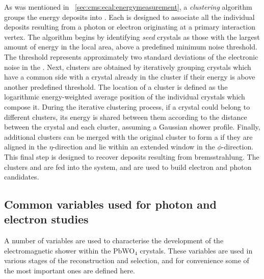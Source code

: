 As was mentioned in \Sec~\ref{sec:cms:ecal:energymeasurement}, a \emph{clustering} algorithm~\cite{CMS-PAS-EGM-13-001,CMS-PAS-EGM-14-001} groups the \ECAL energy deposits into \SC\s. Each \SC is designed to associate all the individual deposits resulting from a photon or electron originating at a primary interaction vertex.
The algorithm begins by identifying \emph{seed} crystals as those with the largest amount of energy in the local area, above a predefined minimum noise threshold. The threshold %
represents approximately two standard deviations of the electronic noise in the \ECAL. Next, clusters are obtained by iteratively grouping crystals which have a common side with a crystal already in the cluster if their energy is above another predefined threshold. The location of a cluster is defined as the logarithmic energy-weighted average position of the individual crystals which compose it. During the iterative clustering process, if a crystal could belong to different clusters, its energy is shared between them according to the distance between the crystal and each cluster, assuming a Gaussian shower profile. Finally, additional clusters can be merged with the original cluster to form a \SC if they are aligned in the $\eta$-direction and lie within an extended window in the $\phi$-direction. This final step is designed to recover deposits resulting from bremsstrahlung.
The clusters and \SC\s are fed into the \PF system, and are used to build electron and photon candidates.

\subsection{Common variables used for photon and electron studies}
\label{sec:reco:photon:showershapes}

A number of variables are used to characterise the development of the electromagnetic shower within the PbWO$_4$ crystals. These variables are used in various stages of the reconstruction and selection, and for convenience some of the most important ones are defined here.
%


